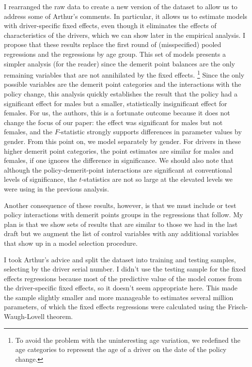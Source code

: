 \documentclass[12pt]{paper}
\begin{document}
I rearranged the raw data to create a new version of the dataset to allow us to address some of Arthur's comments. 
In particular, it allows us to estimate models with driver-specific fixed effects, even though
it eliminates the effects of characteristics of the drivers, which we can show later in the empirical analysis. 
I propose that these results replace the first round of (misspecified) pooled regressions and the regressions 
by age group. 
This set of models presents a simpler analysis (for the reader) since the demerit point balances are the only remaining variables that are not annihilated by the fixed effects.%
\footnote{To avoid the problem with the uninteresting age variation, we redefined the age categories
to represent the age of a driver on the date of the policy change.} 
Since the only possible variables are the demerit point categories and the interactions with the policy change, 
this analysis quickly establishes the result that the policy had a significant effect for males but a smaller, statistically insignificant effect for females. 
For us, the authors, this is a fortunate outcome because it does not change the focus of our paper:
the effect was significant for males but not females, 
and the $F$-statistic strongly supports differences in parameter values by gender. 
From this point on, we model separately by gender. 
For drivers in these higher demerit point categories, the point estimates are similar for males and females, if one ignores the difference in significance. 
We should also note that although the policy-demerit-point interactions are significant at conventional levels of significance, the $t$-statistics are not so large at the elevated levels we were using in the previous analysis. 

Another consequence of these results, however, is that we must include or test policy interactions with demerit points groups in the regressions that follow. 
My plan is that we show sets of results that are similar to those we had in the last draft 
but we augment the list of control variables with any additional variables that show up in a model selection procedure. 


I took Arthur's advice and split the dataset into training and testing samples, selecting by the driver serial number.  
I didn't use the testing sample for the fixed effects regressions because most of the predictive value of the model comes from the driver-specific fixed effects, so it doesn't seem appropriate here. 
This made the sample slightly smaller and more manageable to estimates several million parameters, of which the fixed effects regressions were calculated using the Frisch-Waugh-Lovell theorem. 
\end{document}
